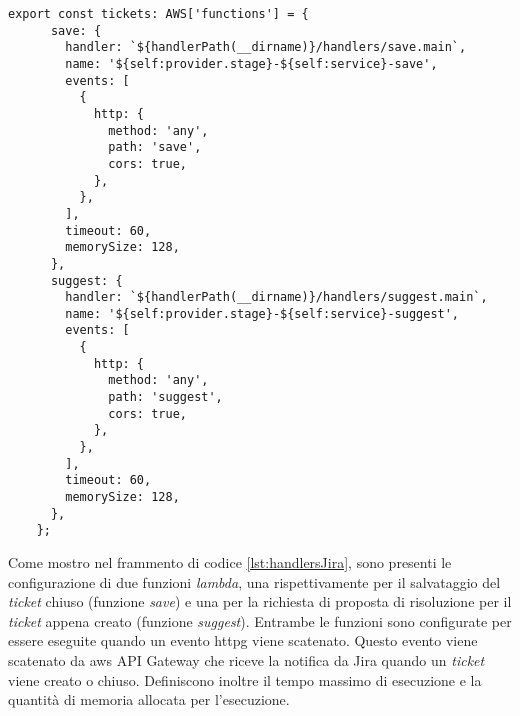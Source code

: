 \begin{lstlisting}[caption=Configurazione delle funzioni \textit{lambda} del sistema Jira, label=lst:handlersJira]
    export const tickets: AWS['functions'] = {
      save: {
        handler: `${handlerPath(__dirname)}/handlers/save.main`,
        name: '${self:provider.stage}-${self:service}-save',
        events: [
          {
            http: {
              method: 'any',
              path: 'save',
              cors: true,
            },
          },
        ],
        timeout: 60,
        memorySize: 128,
      },
      suggest: {
        handler: `${handlerPath(__dirname)}/handlers/suggest.main`,
        name: '${self:provider.stage}-${self:service}-suggest',
        events: [
          {
            http: {
              method: 'any',
              path: 'suggest',
              cors: true,
            },
          },
        ],
        timeout: 60,
        memorySize: 128,
      },
    };
\end{lstlisting}
Come mostro nel frammento di codice \ref{lst:handlersJira}, sono presenti le configurazione di due funzioni \textit{lambda}, una rispettivamente per il salvataggio del \textit{ticket} chiuso (funzione \textit{save}) e una per la richiesta di proposta di risoluzione per il \textit{ticket} appena creato (funzione \textit{suggest}).  Entrambe le funzioni sono configurate per essere eseguite quando un evento \gls{httpg} viene scatenato. Questo evento viene scatenato da \gls{aws} API Gateway che riceve la notifica da Jira quando un \textit{ticket} viene creato o chiuso.
Definiscono inoltre il tempo massimo di esecuzione e la quantità di memoria allocata per l'esecuzione.

